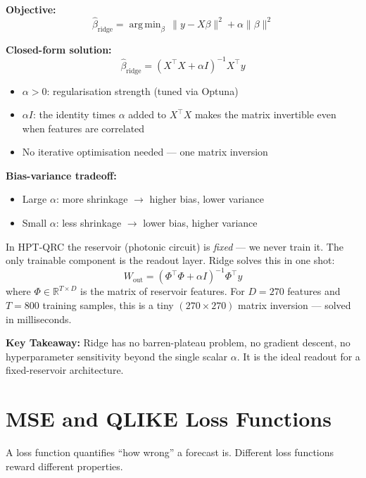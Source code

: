\documentclass[11pt]{article}
\DeclareMathOperator*{\argmin}{arg\,min}
\newcommand{\concept}[2]{%
  \begin{tcolorbox}[conceptbox, title={#1}]
  #2
  \end{tcolorbox}
}
\newcommand{\mathblock}[2]{%
  \begin{tcolorbox}[mathbox, title={Math: #1}]
  #2
  \end{tcolorbox}
}
\newcommand{\example}[2]{%
  \begin{tcolorbox}[examplebox, title={Concrete Example: #1}]
  #2
  \end{tcolorbox}
}
\newcommand{\keypoint}[1]{%
  \begin{tcolorbox}[keybox]
  \textbf{Key Takeaway:} #1
  \end{tcolorbox}
}
\begin{document}
\mathblock{Ridge Objective and Solution}{
\textbf{Objective:}
\[
  \hat\beta_{\text{ridge}} = \argmin_\beta \,\|y - X\beta\|^2
                             + \alpha \|\beta\|^2
\]

\textbf{Closed-form solution:}
\[
  \hat\beta_{\text{ridge}} = (X^\top X + \alpha I)^{-1} X^\top y
\]

\begin{itemize}
  \item $\alpha > 0$: regularisation strength (tuned via Optuna)
  \item $\alpha I$: the identity times $\alpha$ added to $X^\top X$
        makes the matrix invertible even when features are correlated
  \item No iterative optimisation needed --- one matrix inversion
\end{itemize}

\textbf{Bias-variance tradeoff:}
\begin{itemize}
  \item Large $\alpha$: more shrinkage $\to$ higher bias, lower variance
  \item Small $\alpha$: less shrinkage $\to$ lower bias, higher variance
\end{itemize}
}

\example{Why Ridge is Perfect for Reservoir Computing}{
In HPT-QRC the reservoir (photonic circuit) is \emph{fixed} --- we never
train it. The only trainable component is the readout layer.
Ridge solves this in one shot:
\[
  W_{\text{out}} = (\Phi^\top \Phi + \alpha I)^{-1} \Phi^\top y
\]
where $\Phi \in \mathbb{R}^{T \times D}$ is the matrix of reservoir features.
For $D = 270$ features and $T = 800$ training samples, this is a tiny
$(270 \times 270)$ matrix inversion --- solved in milliseconds.
}

\keypoint{Ridge has no barren-plateau problem, no gradient descent, no
hyperparameter sensitivity beyond the single scalar $\alpha$. It is the
ideal readout for a fixed-reservoir architecture.}

\section{MSE and QLIKE Loss Functions}

\concept{Two Ways to Measure Forecast Error}{
A loss function quantifies ``how wrong'' a forecast is. Different loss
functions reward different properties.
}
\end{document}
